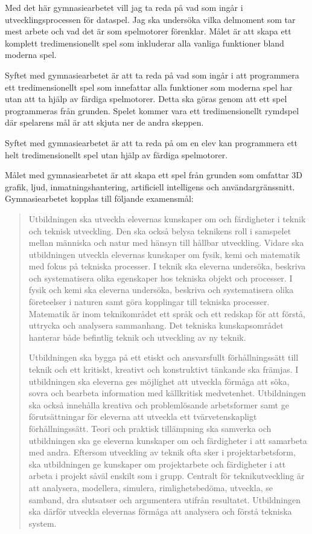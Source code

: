 \documentclass[12pt, a4paper]{article}
\begin{document}
	Med det här gymnasiearbetet vill jag ta reda på vad som ingår i utvecklingsprocessen för dataspel. Jag ska undersöka vilka delmoment som tar mest arbete och vad det är som spelmotorer förenklar. Målet är att skapa ett komplett tredimensionellt spel som inkluderar alla vanliga funktioner bland moderna spel. 
	
	Syftet med gymnasiearbetet är att ta reda på vad som ingår i att programmera ett tredimensionellt spel som innefattar alla funktioner som moderna spel har utan att ta hjälp av färdiga spelmotorer. Detta ska göras genom att ett spel programmeras från grunden. Spelet kommer vara ett tredimensionellt rymdspel där spelarens mål är att skjuta ner de andra skeppen. 
	
	Syftet med gymnasiearbetet är att ta reda på om en elev kan programmera ett helt tredimensionellt spel utan hjälp av färdiga spelmotorer. 
	
	Målet med gymnasiearbetet är att skapa ett spel från grunden som omfattar 3D grafik, ljud, inmatningshantering, artificiell intelligens och användargränssnitt. \\
	
	\noindent Gymnasiearbetet kopplas till följande examensmål:
	
	\begin{quote} \small
		Utbildningen ska utveckla elevernas kunskaper om och färdigheter i teknik och teknisk utveckling. Den ska också belysa teknikens roll i samspelet mellan människa och natur med hänsyn till hållbar utveckling. Vidare ska utbildningen utveckla elevernas kunskaper om fysik, kemi och matematik med fokus på tekniska processer. I teknik ska eleverna undersöka, beskriva och systematisera olika egenskaper hos tekniska objekt och processer. I fysik och kemi ska eleverna undersöka, beskriva och systematisera olika företeelser i naturen samt göra kopplingar till tekniska processer. Matematik är inom teknikområdet ett språk och ett redskap för att förstå, uttrycka och analysera sammanhang. Det tekniska kunskapsområdet hanterar både befintlig teknik och utveckling av ny teknik.
		
Utbildningen ska bygga på ett etiskt och ansvarsfullt förhållningssätt till teknik och ett kritiskt, kreativt och konstruktivt tänkande ska främjas. I utbildningen ska eleverna ges möjlighet att utveckla förmåga att söka, sovra och bearbeta information med källkritisk medvetenhet. Utbildningen ska också innehålla kreativa och problemlösande arbetsformer samt ge förutsättningar för eleverna att utveckla ett tvärvetenskapligt förhållningssätt. Teori och praktisk tillämpning ska samverka och utbildningen ska ge eleverna kunskaper om och färdigheter i att samarbeta med andra. Eftersom utveckling av teknik ofta sker i projektarbetsform, ska utbildningen ge kunskaper om projektarbete och färdigheter i att arbeta i projekt såväl enskilt som i grupp. Centralt för teknikutveckling är att analysera, modellera, simulera, rimlighetsbedöma, utveckla, se samband, dra slutsatser och argumentera utifrån resultatet. Utbildningen ska därför utveckla elevernas förmåga att analysera och förstå tekniska system.
	\end{quote}
	
\end{document}
